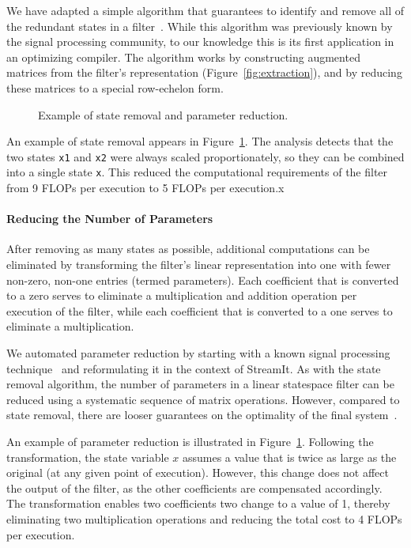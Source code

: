 We have adapted a simple algorithm that guarantees to identify and
remove all of the redundant states in a filter~\cite{Mayne}.  While
this algorithm was previously known by the signal processing
community, to our knowledge this is its first application in an
optimizing compiler.  The algorithm works by constructing augmented
matrices from the filter's representation
(Figure~\ref{fig:extraction}), and by reducing these matrices to a
special row-echelon form.

\begin{figure}[t]
\caption{Example of state removal and parameter reduction.\protect\label{fig:states}}
\end{figure}

An example of state removal appears in Figure~\ref{fig:states}.  The
analysis detects that the two states {\tt x1} and {\tt x2} were always
scaled proportionately, so they can be combined into a single state
{\tt x}.  This reduced the computational requirements of the filter
from 9 FLOPs per execution to 5 FLOPs per execution.x

\paragraph*{Reducing the Number of Parameters}  After removing as 
many states as possible, additional computations can be eliminated by
transforming the filter's linear representation into one with fewer
non-zero, non-one entries (termed parameters).  Each coefficient that
is converted to a zero serves to eliminate a multiplication and
addition operation per execution of the filter, while each coefficient
that is converted to a one serves to eliminate a multiplication.  

We automated parameter reduction by starting with a known signal
processing technique~\cite{Ackermann/Bucy} and reformulating it in the
context of StreamIt.  As with the state removal algorithm, the number
of parameters in a linear statespace filter can be reduced using a
systematic sequence of matrix operations.  However, compared to state
removal, there are looser guarantees on the optimality of the final
system~\cite{agrawal:cases:2005}.

An example of parameter reduction is illustrated in
Figure~\ref{fig:states}.  Following the transformation, the state
variable $x$ assumes a value that is twice as large as the original
(at any given point of execution).  However, this change does not
affect the output of the filter, as the other coefficients are
compensated accordingly.  The transformation enables two coefficients
two change to a value of 1, thereby eliminating two multiplication
operations and reducing the total cost to 4 FLOPs per execution.

